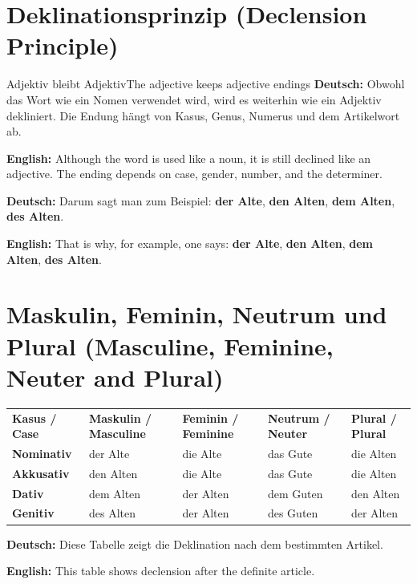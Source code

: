 \documentclass[a4paper,11pt]{article}
\newcommand{\GermanText}[1]{\textbf{Deutsch: }#1\par}
\newcommand{\EnglishText}[1]{{\small\color{SoftGray}\textbf{English: }#1\par}}
\begin{document}
\section{Deklinationsprinzip \textnormal{(Declension Principle)}}
\begin{grammarentry}{Adjektiv bleibt Adjektiv}{The adjective keeps adjective endings}
\GermanText{Obwohl das Wort wie ein Nomen verwendet wird, wird es weiterhin wie ein Adjektiv dekliniert. Die Endung hängt von Kasus, Genus, Numerus und dem Artikelwort ab.}
\EnglishText{Although the word is used like a noun, it is still declined like an adjective. The ending depends on case, gender, number, and the determiner.}
\GermanText{Darum sagt man zum Beispiel: \textbf{der Alte}, \textbf{den Alten}, \textbf{dem Alten}, \textbf{des Alten}.}
\EnglishText{That is why, for example, one says: \textbf{der Alte}, \textbf{den Alten}, \textbf{dem Alten}, \textbf{des Alten}.}
\end{grammarentry}

\section{Maskulin, Feminin, Neutrum und Plural \textnormal{(Masculine, Feminine, Neuter and Plural)}}
\begin{longtable}{>{\bfseries}p{2.5cm}|p{2.8cm}|p{2.8cm}|p{2.8cm}|p{2.8cm}}
\rowcolor{HeaderBlueDark}
\color{white}\textbf{Kasus / Case} &
\color{white}\textbf{Maskulin / Masculine} &
\color{white}\textbf{Feminin / Feminine} &
\color{white}\textbf{Neutrum / Neuter} &
\color{white}\textbf{Plural / Plural} \\
Nominativ & der Alte & die Alte & das Gute & die Alten \\
Akkusativ & den Alten & die Alte & das Gute & die Alten \\
Dativ & dem Alten & der Alten & dem Guten & den Alten \\
Genitiv & des Alten & der Alten & des Guten & der Alten \\
\end{longtable}
\GermanText{Diese Tabelle zeigt die Deklination nach dem bestimmten Artikel.}
\EnglishText{This table shows declension after the definite article.}
\end{document}
